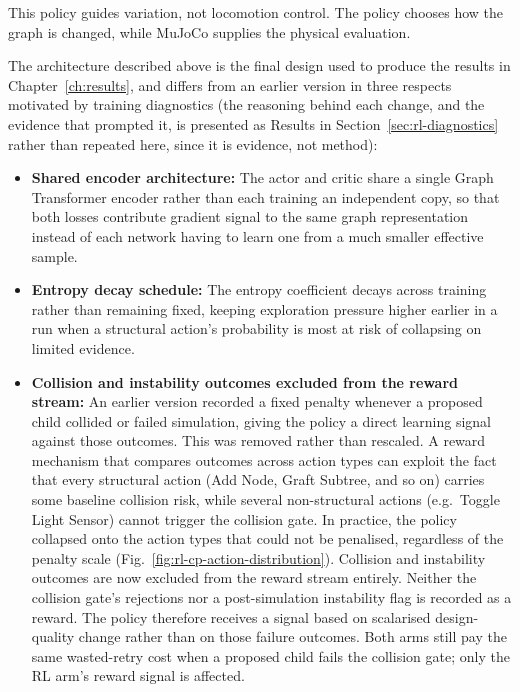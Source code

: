 \documentclass[12pt,a4paper]{report}
\begin{document}
This policy guides variation, not locomotion control. The policy chooses how the graph is changed, while MuJoCo supplies the physical evaluation.

The architecture described above is the final design used to produce the results in Chapter~\ref{ch:results}, and differs from an earlier version in three respects motivated by training diagnostics (the reasoning behind each change, and the evidence that prompted it, is presented as Results in Section~\ref{sec:rl-diagnostics} rather than repeated here, since it is evidence, not method):

\begin{itemize}
    \item \textbf{Shared encoder architecture:} The actor and critic share a single Graph Transformer encoder rather than each training an independent copy, so that both losses contribute gradient signal to the same graph representation instead of each network having to learn one from a much smaller effective sample.
    \item \textbf{Entropy decay schedule:} The entropy coefficient decays across training rather than remaining fixed, keeping exploration pressure higher earlier in a run when a structural action's probability is most at risk of collapsing on limited evidence.
    \item \textbf{Collision and instability outcomes excluded from the reward stream:} An earlier version recorded a fixed penalty whenever a proposed child collided or failed simulation, giving the policy a direct learning signal against those outcomes. This was removed rather than rescaled. A reward mechanism that compares outcomes across action types can exploit the fact that every structural action (Add Node, Graft Subtree, and so on) carries some baseline collision risk, while several non-structural actions (e.g.\ Toggle Light Sensor) cannot trigger the collision gate. In practice, the policy collapsed onto the action types that could not be penalised, regardless of the penalty scale (Fig.~\ref{fig:rl-cp-action-distribution}). Collision and instability outcomes are now excluded from the reward stream entirely. Neither the collision gate's rejections nor a post-simulation instability flag is recorded as a reward. The policy therefore receives a signal based on scalarised design-quality change rather than on those failure outcomes. Both arms still pay the same wasted-retry cost when a proposed child fails the collision gate; only the RL arm's reward signal is affected.
\end{itemize}
\end{document}

